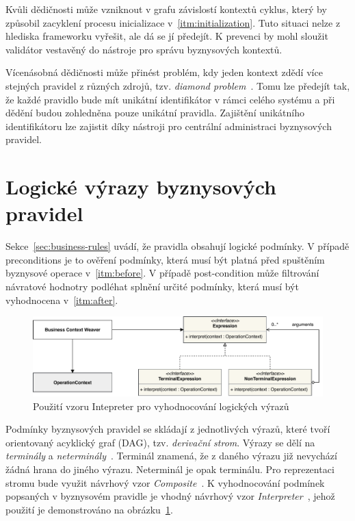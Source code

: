 Kvůli dědičnosti může vzniknout v grafu závislostí kontextů cyklus, který by způsobil zacyklení
procesu inicializace v~\ref{itm:initialization}. Tuto situaci nelze z hlediska frameworku vyřešit,
ale dá se jí předejít. K prevenci by mohl sloužit validátor vestavěný do nástroje pro správu
byznysových kontextů.

Vícenásobná dědičnosti může přinést problém, kdy jeden kontext zdědí více stejných pravidel z
různých zdrojů, tzv. \textit{diamond problem}~\cite{boyen1994generalized}. Tomu lze předejít tak, že
každé pravidlo bude mít unikátní identifikátor v rámci celého systému a při dědění budou zohledněna
pouze unikátní pravidla. Zajištění unikátního identifikátoru lze zajistit díky nástroji pro centrální
administraci byznysových pravidel.

\section{Logické výrazy byznysových pravidel}

Sekce~\ref{sec:business-rules} uvádí, že pravidla obsahují logické podmínky. V případě preconditions je to
ověření podmínky, která musí být platná před spuštěním byznysové operace v~\ref{itm:before}. V případě
post-condition může filtrování návratové hodnotry podléhat splnění určité podmínky, která musí být
vyhodnocena v~\ref{itm:after}.

\begin{figure}
    \centering
    \includegraphics[keepaspectratio=true, width=1\linewidth]{figures/expression.pdf}
    \caption{Použití vzoru Intepreter pro vyhodnocování logických výrazů}
    \label{fig:expression}
\end{figure}

Podmínky byznysových pravidel se skládají z jednotlivých výrazů, které tvoří
orientovaný acyklický graf (\gls{DAG}), tzv. \textit{derivační strom}.
Výrazy se dělí na \textit{terminály} a \textit{neterminály}~\cite{melichar2003jazyky}.
Terminál znamená, že z daného výrazu již nevychází žádná hrana do jiného výrazu.
Neterminál je opak terminálu. Pro reprezentaci stromu bude využit návrhový vzor
\textit{Composite}~\cite{fowler2002patterns}. K vyhodnocování podmínek popsaných v byznysovém
pravidle je vhodný návrhový vzor \textit{Interpreter}~\cite{fowler2002patterns}, jehož
použití je demonstrováno na obrázku~\ref{fig:expression}.

